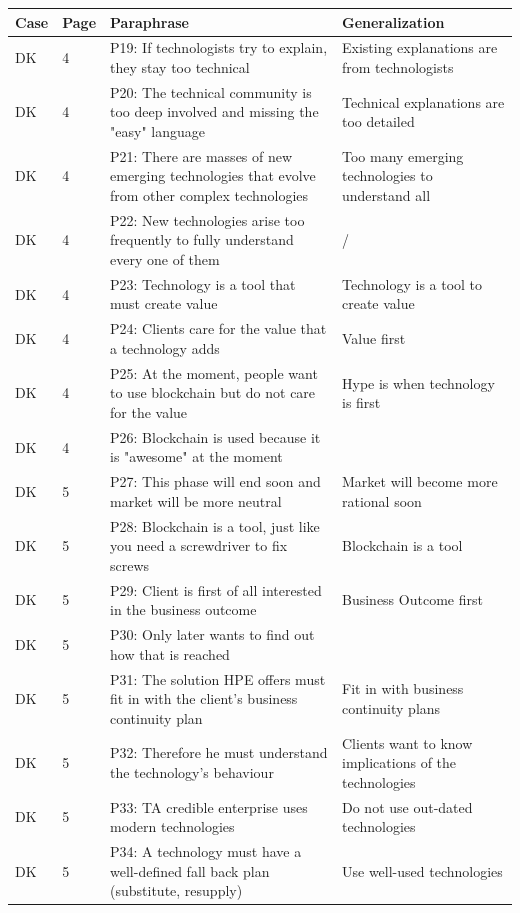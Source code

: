 \begin{table}[H]
    \centering
    \begin{tabularx}{\textwidth}{ll|X|p{4.5cm}}
    Case & Page & Paraphrase & Generalization  \\ \hline
    	DK & 4 & P19: If technologists try to explain, they stay too technical & Existing explanations are from technologists \\
	DK & 4 & P20: The technical community is too deep involved and missing the "easy" language & Technical explanations are too detailed \\
	DK & 4 & P21: There are masses of new emerging technologies that evolve from other complex technologies & Too many emerging technologies to understand all  \\
	DK & 4 & P22: New technologies arise too frequently to fully understand every one of them & / \\
	DK & 4 & P23: Technology is a tool that must create value & Technology is a tool to create value  \\
	DK & 4 & P24: Clients care for the value that a technology adds & Value first  \\
	DK & 4 & P25: At the moment, people want to use blockchain but do not care for the value & Hype is when technology is first \\
	DK & 4 & P26: Blockchain is used because it is "awesome" at the moment  \\
	DK & 5 & P27: This phase will end soon and market will be more neutral & Market will become more rational soon \\
	DK & 5 & P28: Blockchain is a tool, just like you need a screwdriver to fix screws & Blockchain is a tool \\
	DK & 5 & P29: Client is first of all interested in the business outcome & Business Outcome first \\
	DK & 5 & P30: Only later wants to find out how that is reached & \   \\
	DK & 5 & P31: The solution HPE offers must fit in with the client's business continuity plan & Fit in with business continuity plans  \\
	DK & 5 & P32: Therefore he must understand the technology's behaviour & Clients want to know implications of the technologies \\
	DK & 5 & P33: TA credible enterprise uses modern technologies & Do not use out-dated technologies  \\
	DK & 5 & P34: A technology must have a well-defined fall back plan (substitute, resupply) & Use well-used technologies  \\

\end{tabularx}
\end{table}

